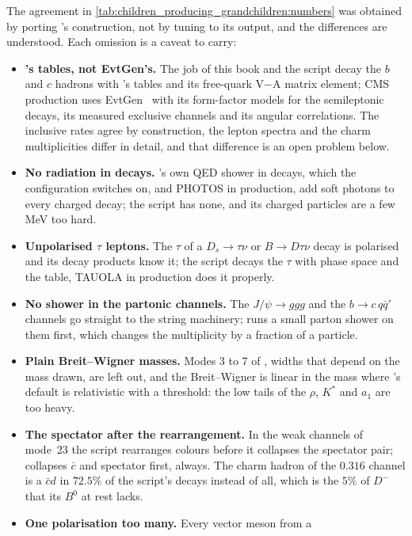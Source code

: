 The agreement in \cref{tab:children_producing_grandchildren:numbers} was
obtained by porting \PYTHIA's construction, not by tuning to its output,
and the differences are understood. Each omission is a caveat to carry:
\begin{itemize}
  \item \textbf{\PYTHIA's tables, not EvtGen's.} The \CMSSW job of this
    book and the script decay the $b$ and $c$ hadrons with \PYTHIA's
    tables and its free-quark V$-$A matrix element; CMS production uses
    EvtGen~\cite{Lange:2001uf,Abudinen:2024wpc} with its form-factor
    models for the semileptonic decays, its measured exclusive channels
    and its angular correlations. The inclusive rates agree by
    construction, the lepton spectra and the charm multiplicities differ
    in detail, and that difference is an open problem below.
  \item \textbf{No radiation in decays.} \PYTHIA's own QED shower in
    decays, which the \CMSSW configuration switches on, and PHOTOS in
    production, add soft photons to every charged decay; the script has
    none, and its charged particles are a few MeV too hard.
  \item \textbf{Unpolarised $\tau$ leptons.} The $\tau$ of a $D_s\to\tau\nu$
    or $B\to D\tau\nu$ decay is polarised and its decay products know it;
    the script decays the $\tau$ with phase space and the table, TAUOLA in
    production does it properly.
  \item \textbf{No shower in the partonic channels.} The $J/\psi\to ggg$
    and the $b\to c\,q\bar q'$ channels go straight to the string
    machinery; \PYTHIA runs a small parton shower on them first, which
    changes the multiplicity by a fraction of a particle.
  \item \textbf{Plain Breit--Wigner masses.} Modes 3 to 7 of \PYTHIA,
    widths that depend on the mass drawn, are left out, and the
    Breit--Wigner is linear in the mass where \PYTHIA's default is
    relativistic with a threshold: the low tails of the $\rho$, $K^*$
    and $a_1$ are too heavy.
  \item \textbf{The spectator after the rearrangement.} In the weak
    channels of mode~23 the script rearranges colours before it collapses
    the spectator pair; \PYTHIA collapses $\bar c$ and spectator first,
    always. The charm hadron of the $0.316$ channel is a $\bar cd$ in
    $72.5\%$ of the script's decays instead of all, which is the $5\%$
    of $D^-$ that its $B^0$ at rest lacks.
  \item \textbf{One polarisation too many.} Every vector meson from a

\end{itemize}
